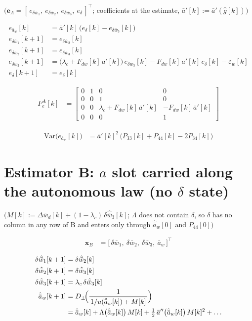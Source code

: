 \documentclass[11pt,a4paper,fontset=none]{ctexart}
\newcommand{\ba}{\bar{a}}
\newcommand{\bw}{\bar{w}}
\newcommand{\ap}{\ba'}
\newcommand{\app}{\ba''}
\newcommand{\ah}{\hat{\ba}_w}
\newcommand{\Dp}{D_{\perp}}
\newcommand{\dl}{\delta}
\newcommand{\gh}{\hat{g}}
\newcommand{\lam}{\Lambda}
\begin{document}
$\bigl(\mathbf{e}_A = [\,e_{\delta\bw_1},\ e_{\delta\bw_2},\ e_{\delta\bw_3},\ e_{\dl}\,]^{\top}$; coefficients at the estimate, $\ap[k] := \ap(\gh[k])\bigr)$

\begin{align*}
e_{\ba_w}[k]         &= \ap[k]\,\bigl(e_{\dl}[k] - e_{\delta\bw_3}[k]\bigr) \\[6pt]
e_{\delta\bw_1}[k+1] &= e_{\delta\bw_2}[k] \\
e_{\delta\bw_2}[k+1] &= e_{\delta\bw_3}[k] \\
e_{\delta\bw_3}[k+1] &= \bigl(\lambda_c + F_{dw}[k]\,\ap[k]\bigr)\,e_{\delta\bw_3}[k] - F_{dw}[k]\,\ap[k]\,e_{\dl}[k] - \varepsilon_w[k] \\
e_{\dl}[k+1]         &= e_{\dl}[k]
\end{align*}

\begin{align*}
F_e^{A}[k] &= \begin{bmatrix}
0 & 1 & 0 & 0 \\
0 & 0 & 1 & 0 \\
0 & 0 & \lambda_c + F_{dw}[k]\,\ap[k] & -F_{dw}[k]\,\ap[k] \\
0 & 0 & 0 & 1
\end{bmatrix}
\end{align*}

\begin{align*}
\mathrm{Var}\bigl(e_{\ba_w}[k]\bigr) &= \ap[k]^{2}\,\bigl(P_{33}[k] + P_{44}[k] - 2P_{34}[k]\bigr)
\end{align*}

\section{Estimator B: $a$ slot carried along the autonomous law (no $\dl$ state)}

$\bigl(M[k] := \Delta\bw_d[k] + (1-\lambda_c)\,\delta\hat{\bw}_3[k]$; $\lam$ does not contain $\dl$, so $\dl$ has no column in any row of B and enters only through $\ah[0]$ and $P_{44}[0]\bigr)$

\begin{align*}
\mathbf{x}_B &= \bigl[\,\delta\bw_1,\ \delta\bw_2,\ \delta\bw_3,\ \ba_w\,\bigr]^{\top}
\end{align*}

\begin{align*}
\delta\hat{\bw}_1[k+1] &= \delta\hat{\bw}_2[k] \\
\delta\hat{\bw}_2[k+1] &= \delta\hat{\bw}_3[k] \\
\delta\hat{\bw}_3[k+1] &= \lambda_c\,\delta\hat{\bw}_3[k] \\
\ah[k+1]               &= \Dp\!\Bigl(\frac{1}{\,1/u(\ah[k]) + M[k]\,}\Bigr) \\
                       &= \ah[k] + \lam\bigl(\ah[k]\bigr)\,M[k] + \tfrac{1}{2}\,\app\bigl(\ah[k]\bigr)\,M[k]^{2} + \dots
\end{align*}
\end{document}
